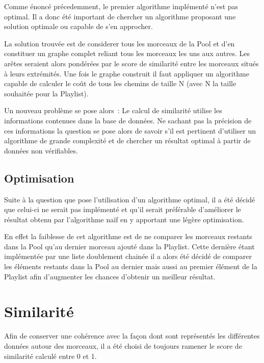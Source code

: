 Comme énoncé précedemment, le premier algorithme implémenté n'est pas optimal. Il a donc été important de chercher un algorithme proposant une solution optimale ou capable de s'en approcher.\newline

La solution trouvée est de considerer tous les morceaux de la Pool et d'en constituer un graphe complet reliant tous les morceaux les uns aux autres. Les arêtes seraient alors pondérées par le score de similarité entre les morceaux situés à leurs extrémités. Une fois le graphe construit il faut appliquer un algorithme capable de calculer le coût de tous les chemins de taille N (avec N la taille souhaitée pour la Playlist).\newline

Un nouveau problème se pose alors~: Le calcul de similarité utilise les informations contenues dans la base de données. Ne sachant pas la précision de ces informations la question se pose alors de savoir s'il est pertinent d'utiliser un algorithme de grande complexité et de chercher un résultat optimal à partir de données non vérifiables.

\subsection{Optimisation}
\label{impl:selection:optimisation}

Suite à la question que pose l'utilisation d'un algorithme optimal, il a été décidé que celui-ci ne serait pas implémenté et qu'il serait préférable d'améliorer le résultat obtenu par l'algorithme naïf en y apportant une légère optimisation.\newline

En effet la faiblesse de cet algorithme est de ne comparer les morceaux restants dans la Pool qu'au dernier morceau ajouté dans la Playlist. Cette dernière étant implémentée par une liste doublement chainée il a alors été décidé de comparer les éléments restants dans la Pool au dernier mais aussi au premier élément de la Playlist afin d'augmenter les chances d'obtenir un meilleur résultat.


\section{Similarité}
\label{impl:similarite}

Afin de conserver une cohérence avec la façon dont sont représentés les différentes données autour des morceaux, il a été choisi de toujours ramener le score de similarité calculé entre 0 et 1.

